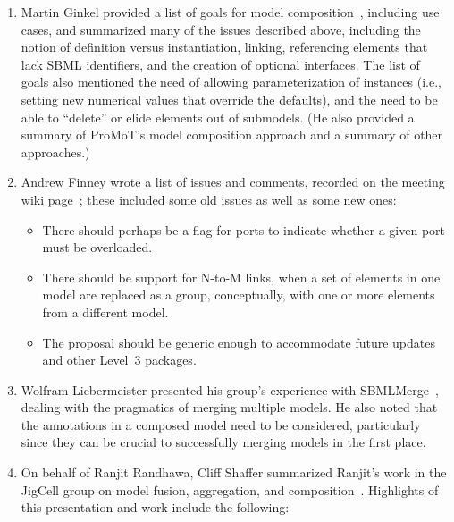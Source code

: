 \begin{enumerate}

\item Martin Ginkel provided a list of goals for model
  composition~\citep{ginkel:2007}, including use cases, and summarized many of the
  issues described above, including the notion of definition versus
  instantiation, linking, referencing elements that lack SBML
  identifiers, and the creation of optional interfaces.  The list of
  goals also mentioned the need of allowing parameterization of
  instances (i.e., setting new numerical values that override the
  defaults), and the need to be able to ``delete'' or elide elements out
  of submodels.  (He also provided a summary of ProMoT's model
  composition approach and a summary of other approaches.)

\item Andrew Finney wrote a list of issues and comments, recorded on the
  meeting wiki page~\citep{finney:2007}; these included some old issues
  as well as some new ones:

  \begin{itemize}

  \item There should perhaps be a flag for ports to indicate whether a
    given port must be overloaded.

  \item There should be support for N-to-M links, when a set of elements
    in one model are replaced as a group, conceptually, with one or more
    elements from a different model.
    
  \item The proposal should be generic enough to accommodate future
    updates and other Level~3 packages.

  \end{itemize}
  
\item Wolfram Liebermeister presented his group's experience with
  SBMLMerge~\citep{liebermeister:2007}, dealing with the pragmatics of
  merging multiple models.  He also noted that the annotations in a
  composed model need to be considered, particularly since they can be
  crucial to successfully merging models in the first place.

\item On behalf of Ranjit Randhawa, Cliff Shaffer summarized Ranjit's
  work in the JigCell group on model fusion, aggregation, and
  composition~\citep{randhawa:2007}.  Highlights of this presentation
  and work include the following:


\end{enumerate}
